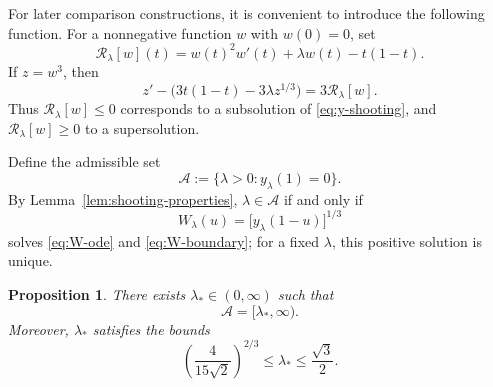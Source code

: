 \documentclass[12pt,preprint]{amsart}
\numberwithin{equation}{section}
\theoremstyle{plain}
\newtheorem{proposition}[theorem]{Proposition}
\theoremstyle{definition}
\begin{document}
For later comparison constructions, it is convenient to introduce the
following function.  For a nonnegative function $w$ with $w(0)=0$, set
\[
 \mathcal R_\lambda[w](t)=w(t)^2w'(t)+\lambda w(t)-t(1-t).
\]
If \(z=w^3\), then
\[
 z'-\bigl(3t(1-t)-3\lambda z^{1/3}\bigr)=3\mathcal R_\lambda[w].
\]
Thus \(\mathcal R_\lambda[w]\le0\) corresponds to a subsolution of
\eqref{eq:y-shooting}, and \(\mathcal R_\lambda[w]\ge0\) to a supersolution.

Define the admissible set
\[
 \mathcal A:=\{\lambda>0:y_\lambda(1)=0\}.
\]
By Lemma~\ref{lem:shooting-properties}, \(\lambda\in\mathcal A\) if and only if
\[
 W_\lambda(u)=\bigl[y_\lambda(1-u)\bigr]^{1/3}
\]
solves \eqref{eq:W-ode} and \eqref{eq:W-boundary}; for a fixed \(\lambda\), this positive
solution is unique.

\begin{proposition}
\label{prop:Cstar-halfline}
There exists \(\lambda_*\in(0,\infty)\) such that
\begin{equation}
 \mathcal A=[\lambda_*,\infty).
 \label{eq:Z-halfline}
\end{equation}
Moreover, \(\lambda_*\) satisfies the bounds
\begin{equation}
 \left(\frac{4}{15\sqrt2}\right)^{2/3}
 \le \lambda_*\le\frac{\sqrt3}{2}.
 \label{eq:rough-Cstar-bounds}
\end{equation}
\end{proposition}
\end{document}
